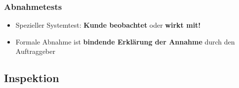 		\subsubsection{Abnahmetests}
					
			\begin{itemize}
				\item Spezieller Systemtest: \textbf{Kunde beobachtet} oder \textbf{wirkt mit!}
				\item Formale Abnahme ist \textbf{bindende Erklärung der Annahme} durch den Auftraggeber
			\end{itemize}
		
	\subsection{Inspektion}
			
